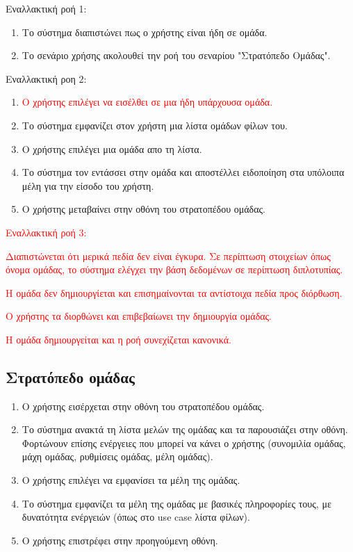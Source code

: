 Εναλλακτική ροή 1:
\begin{enumerate}[label=2.\alph*.,ref=2.\alph*]
\item Το σύστημα διαπιστώνει πως ο χρήστης είναι ήδη σε ομάδα.
\item Το σενάριο χρήσης ακολουθεί την ροή του σεναρίου "Στρατόπεδο Ομάδας".
\end{enumerate}

Εναλλακτική ροη 2:
\begin{enumerate}[label=4.\alph*.,ref=4.\alph*]
\item \textcolor{red}{Ο χρήστης επιλέγει να εισέλθει σε μια ήδη υπάρχουσα ομάδα.}
\item Το σύστημα εμφανίζει στον χρήστη μια λίστα ομάδων φίλων του.
\item Ο χρήστης επιλέγει μια ομάδα απο τη λίστα.
\item Το σύστημα τον εντάσσει στην ομάδα και αποστέλλει ειδοποίηση στα υπόλοιπα μέλη για την είσοδο του χρήστη.
\item Ο χρήστης μεταβαίνει στην οθόνη του στρατοπέδου ομάδας.
\end{enumerate}
\textcolor{red}{
Εναλλακτική ροή 3:}
\begin{enumerate}[label=7.\alph*.,ref=7.\alph*]
\item \textcolor{red}{Διαπιστώνεται ότι μερικά πεδία δεν είναι έγκυρα. Σε περίπτωση στοιχείων όπως όνομα ομάδας, το σύστημα ελέγχει την βάση δεδομένων σε περίπτωση διπλοτυπίας.
\item Η ομάδα δεν δημιουργίεται και επισημαίνονται τα αντίστοιχα πεδία προς διόρθωση. 
\item Ο χρήστης τα διορθώνει και επιβεβαίωνει την δημιουργία ομάδας.
\item Η ομάδα δημιουργείται και η ροή συνεχίζεται κανονικά.}
\end{enumerate}

\newpage
\subsection{Στρατόπεδο ομάδας}
\label{sec:clanbase}
\begin{enumerate}
\item Ο χρήστης εισέρχεται στην οθόνη του στρατοπέδου ομάδας.
\item Το σύστημα ανακτά τη λίστα μελών της ομάδας και τα παρουσιάζει στην οθόνη. Φορτώνουν επίσης ενέργειες που μπορεί να κάνει ο χρήστης (συνομιλία ομάδας, μάχη ομάδας, ρυθμίσεις ομάδας, μέλη ομάδας).
\item Ο χρήστης επιλέγει να εμφανίσει τα μέλη της ομάδας.
\item Το σύστημα εμφανίζει τα μέλη της ομάδας με βασικές πληροφορίες τους, με δυνατότητα ενέργειών (όπως στο use case λίστα φίλων).
\item Ο χρήστης επιστρέφει στην προηγούμενη οθόνη.
\end{enumerate}


